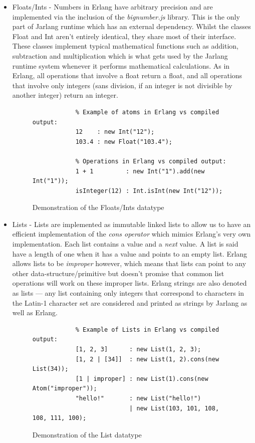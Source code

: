 \documentclass[twoside,12pt,titlepage,a4paper]{article}
\begin{document}
\begin{itemize}
	\item Floats/Ints - Numbers in Erlang have arbitrary precision and are implemented via the inclusion of the \textit{bignumber.js} library. This is the only part of Jarlang runtime which has an external dependency. Whilst the classes Float and Int aren't entirely identical, they share most of their interface. These classes implement typical mathematical functions such as addition, subtraction and multiplication which is what gets used by the Jarlang runtime system whenever it performs mathematical calculations. As in Erlang, all operations that involve a float return a float, and all operations that involve only integers (sans division, if an integer is not divisible by another integer) return an integer.
	\begin{figure}[H]
	\begin{verbatim}
	        % Example of atoms in Erlang vs compiled output:
	        12    : new Int("12");
	        103.4 : new Float("103.4");

	        % Operations in Erlang vs compiled output:
	        1 + 1         : new Int("1").add(new Int("1"));
	        isInteger(12) : Int.isInt(new Int("12"));
	\end{verbatim}
	\caption{Demonstration of the Floats/Ints datatype}
	\end{figure}

	\item Lists - Lists are implemented as immutable linked lists to allow us to have an efficient implementation of the \textit{cons operator} which mimics Erlang's very own implementation. Each list contains a value and a \textit{next} value. A list is said have a length of one when it has a value and points to an empty list. Erlang allows lists to be \textit{improper} however, which means that lists can point to any other data-structure/primitive but doesn't promise that common list operations will work on these improper lists. Erlang strings are also denoted as lists --- any list containing only integers that correspond to characters in the Latin-1 character set are considered and printed as strings by Jarlang as well as Erlang.
	\begin{figure}[H]
	\begin{verbatim}
	        % Example of Lists in Erlang vs compiled output:
	        [1, 2, 3]      : new List(1, 2, 3);
	        [1, 2 | [34]]  : new List(1, 2).cons(new List(34));
	        [1 | improper] : new List(1).cons(new Atom("improper"));
	        "hello!"       : new List("hello!")
	                       | new List(103, 101, 108, 108, 111, 100);
	\end{verbatim}
	\caption{Demonstration of the List datatype}
	\end{figure}


\end{itemize}
\end{document}
